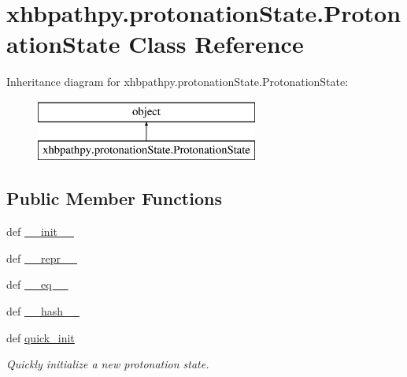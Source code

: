 \hypertarget{classxhbpathpy_1_1protonation_state_1_1_protonation_state}{\section{xhbpathpy.\-protonation\-State.\-Protonation\-State Class Reference}
\label{classxhbpathpy_1_1protonation_state_1_1_protonation_state}
}
Inheritance diagram for xhbpathpy.\-protonation\-State.\-Protonation\-State\-:\begin{figure}[H]
\begin{center}
\leavevmode
\includegraphics[height=2.000000cm]{classxhbpathpy_1_1protonation_state_1_1_protonation_state}
\end{center}
\end{figure}
\subsection*{Public Member Functions}
\begin{DoxyCompactItemize}
\item 
def \hyperlink{classxhbpathpy_1_1protonation_state_1_1_protonation_state_a97fa886feefb45c53f16de89c987ab65}{\-\_\-\-\_\-init\-\_\-\-\_\-}
\item 
def \hyperlink{classxhbpathpy_1_1protonation_state_1_1_protonation_state_a7318ae03f33e71a7a152ad302cc2d3e6}{\-\_\-\-\_\-repr\-\_\-\-\_\-}
\item 
def \hyperlink{classxhbpathpy_1_1protonation_state_1_1_protonation_state_a2d83b7c7c8bb45be4242ebaf8c4e976d}{\-\_\-\-\_\-eq\-\_\-\-\_\-}
\item 
def \hyperlink{classxhbpathpy_1_1protonation_state_1_1_protonation_state_a4d735a3c5252f4ce4bebf4f7e2b82b54}{\-\_\-\-\_\-hash\-\_\-\-\_\-}
\item 
def \hyperlink{classxhbpathpy_1_1protonation_state_1_1_protonation_state_a06d0bb021a69a624e60e4127f061ddef}{quick\-\_\-init}
\begin{DoxyCompactList}\small\item\em Quickly initialize a new protonation state. \end{DoxyCompactList}\end{DoxyCompactItemize}
